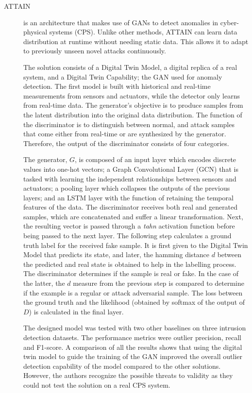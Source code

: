 \begin{description}
    \item[ATTAIN \cite{xu.etal_DigitalTwinbasedAnomaly_2021}] is an architecture that makes use of GANs to detect anomalies in cyber-physical systems (CPS). Unlike other methods, ATTAIN can learn data distribution at runtime without needing static data. This allows it to adapt to previously unseen novel attacks continuously. 

    The solution consists of a Digital Twin Model, a digital replica of a real system, and a Digital Twin Capability; the GAN used for anomaly detection. The first model is built with historical and real-time measurements from sensors and actuators, while the detector only learns from real-time data. The generator's objective is to produce samples from the latent distribution into the original data distribution. The function of the discriminator is to distinguish between normal, and attack samples that come either from real-time or are synthesized by the generator. Therefore, the output of the discriminator consists of four categories. 

    The generator, $G$, is composed of an input layer which encodes discrete values into one-hot vectors; a Graph Convolutional Layer (GCN) that is tasked with learning the independent relationships between sensors and actuators; a pooling layer which collapses the outputs of the previous layers; and an LSTM layer with the function of retaining the temporal features of the data. The discriminator receives both real and generated samples, which are concatenated and suffer a linear transformation. Next, the resulting vector is passed through a \textit{tahn} activation function before being passed to the next layer. The following step calculates a ground truth label for the received fake sample. It is first given to the Digital Twin Model that predicts its state, and later, the hamming distance $d$ between the predicted and real state is obtained to help in the labelling process. The discriminator determines if the sample is real or fake. In the case of the latter, the $d$ measure from the previous step is compared to determine if the example is a regular or attack adversarial sample. The loss between the ground truth and the likelihood (obtained by softmax of the output of $D$) is calculated in the final layer.

    The designed model was tested with two other baselines on three intrusion detection datasets. The performance metrics were outlier precision, recall and F1-score. A comparison of all the results shows that using the digital twin model to guide the training of the GAN improved the overall outlier detection capability of the model compared to the other solutions. However, the authors recognize the possible threats to validity as they could not test the solution on a real CPS system. 
\end{description}


